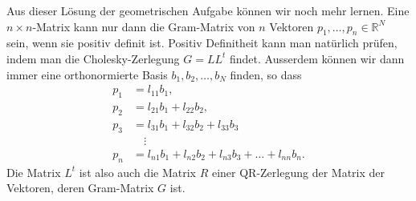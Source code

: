 Aus dieser Lösung der geometrischen Aufgabe können wir noch mehr lernen.
Eine $n\times n$-Matrix kann nur dann die Gram-Matrix von $n$ Vektoren
$p_1,\dots,p_n\in\mathbb{R}^N$
sein, wenn sie positiv definit ist.
Positiv Definitheit kann man natürlich prüfen, indem man die
Cholesky-Zerlegung $G=LL^t$ findet.
Ausserdem können wir dann immer eine orthonormierte Basis
$b_1,b_2,\dots,b_N$ finden, so dass
\begin{align*}
p_1&=l_{11} b_1,
\\
p_2&=l_{21} b_1 + l_{22} b_2,
\\
p_3&=l_{31} b_1 + l_{32} b_2 + l_{33} b_3
\\
&\quad\vdots
\\
p_n&=l_{n1} b_1 + l_{n2} b_2 + l_{n3} b_3 + \dots + l_{nn} b_n.
\end{align*}
Die Matrix $L^t$ ist also auch die Matrix $R$ einer QR-Zerlegung der Matrix
der Vektoren, deren Gram-Matrix $G$ ist.
